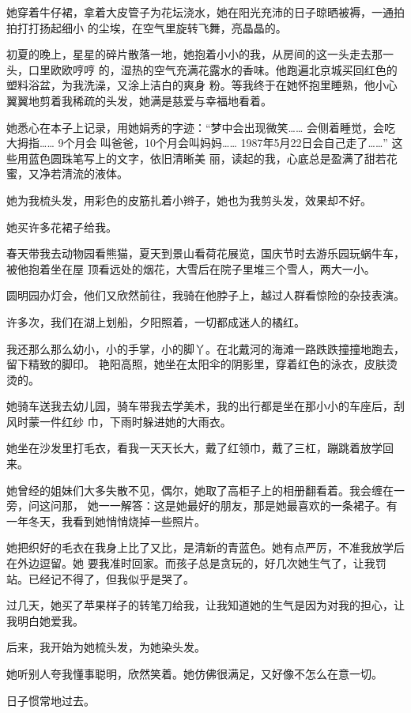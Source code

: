 		她穿着牛仔裙，拿着大皮管子为花坛浇水，她在阳光充沛的日子晾晒被褥，一通拍拍打打扬起细小
	的尘埃，在空气里旋转飞舞，亮晶晶的。

		初夏的晚上，星星的碎片散落一地，她抱着小小的我，从房间的这一头走去那一头，口里欧欧哼哼
	的，湿热的空气充满花露水的香味。他跑遍北京城买回红色的塑料浴盆，为我洗澡，又涂上洁白的爽身
	粉。等我终于在她怀抱里睡熟，他小心翼翼地剪着我稀疏的头发，她满是慈爱与幸福地看着。


		她悉心在本子上记录，用她娟秀的字迹：“梦中会出现微笑…… 会侧着睡觉，会吃大拇指…… 9个月会
	叫爸爸，10个月会叫妈妈…… 1987年5月22日会自己走了……” 这些用蓝色圆珠笔写上的文字，依旧清晰美
	丽，读起的我，心底总是盈满了甜若花蜜，又净若清流的液体。


		她为我梳头发，用彩色的皮筋扎着小辫子，她也为我剪头发，效果却不好。

		她买许多花裙子给我。

		春天带我去动物园看熊猫，夏天到景山看荷花展览，国庆节时去游乐园玩蜗牛车，被他抱着坐在屋
	顶看远处的烟花，大雪后在院子里堆三个雪人，两大一小。

		圆明园办灯会，他们又欣然前往，我骑在他脖子上，越过人群看惊险的杂技表演。

		许多次，我们在湖上划船，夕阳照着，一切都成迷人的橘红。

		我还那么那么幼小，小的手掌，小的脚丫。在北戴河的海滩一路跌跌撞撞地跑去，留下精致的脚印。
	艳阳高照，她坐在太阳伞的阴影里，穿着红色的泳衣，皮肤烫烫的。

		她骑车送我去幼儿园，骑车带我去学美术，我的出行都是坐在那小小的车座后，刮风时蒙一件红纱
	巾，下雨时躲进她的大雨衣。


		她坐在沙发里打毛衣，看我一天天长大，戴了红领巾，戴了三杠，蹦跳着放学回来。

		她曾经的姐妹们大多失散不见，偶尔，她取了高柜子上的相册翻看着。我会缠在一旁，问这问那，
	她一一解答：这是她最好的朋友，那是她最喜欢的一条裙子。有一年冬天，我看到她悄悄烧掉一些照片。

		她把织好的毛衣在我身上比了又比，是清新的青蓝色。她有点严厉，不准我放学后在外边逗留。她
	要我准时回家。而孩子总是贪玩的，好几次她生气了，让我罚站。已经记不得了，但我似乎是哭了。

		过几天，她买了苹果样子的转笔刀给我，让我知道她的生气是因为对我的担心，让我明白她爱我。

		后来，我开始为她梳头发，为她染头发。


		她听别人夸我懂事聪明，欣然笑着。她仿佛很满足，又好像不怎么在意一切。

		日子惯常地过去。

